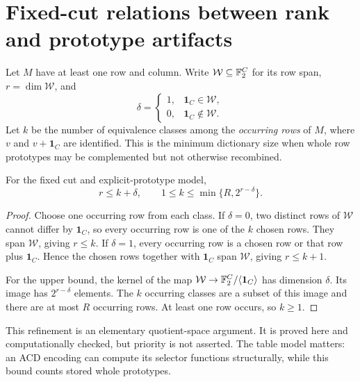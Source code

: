 \section{Fixed-cut relations between rank and prototype artifacts}
\label{sec:quotient}
Let $M$ have at least one row and column. Write $\mathcal W\subseteq\mathbb F_2^C$ for its row span, $r=\dim\mathcal W$, and
\[
 \delta=\begin{cases}1,&\boldsymbol1_C\in\mathcal W,\\0,&\boldsymbol1_C\notin\mathcal W.\end{cases}
\]
Let $k$ be the number of equivalence classes among the \emph{occurring rows} of $M$, where $v$ and $v+\boldsymbol1_C$ are identified. This is the minimum dictionary size when whole row prototypes may be complemented but not otherwise recombined.

\begin{theorem}
\label{thm:quotient}
For the fixed cut and explicit-prototype model,
\begin{equation}
 r\le k+\delta,\qquad
 1\le k\le\min\{R,2^{r-\delta}\}.
 \label{eq:quotient}
\end{equation}
\end{theorem}
\begin{proof}
Choose one occurring row from each class. If $\delta=0$, two distinct rows of $\mathcal W$ cannot differ by $\boldsymbol1_C$, so every occurring row is one of the $k$ chosen rows. They span $\mathcal W$, giving $r\le k$. If $\delta=1$, every occurring row is a chosen row or that row plus $\boldsymbol1_C$. Hence the chosen rows together with $\boldsymbol1_C$ span $\mathcal W$, giving $r\le k+1$.

For the upper bound, the kernel of the map $\mathcal W\to\mathbb F_2^C/\langle\boldsymbol1_C\rangle$ has dimension $\delta$. Its image has $2^{r-\delta}$ elements. The $k$ occurring classes are a subset of this image and there are at most $R$ occurring rows. At least one row occurs, so $k\ge1$.
\end{proof}

This refinement is an elementary quotient-space argument. It is proved here and computationally checked, but priority is not asserted. The table model matters: an ACD encoding can compute its selector functions structurally, while this bound counts stored whole prototypes.

